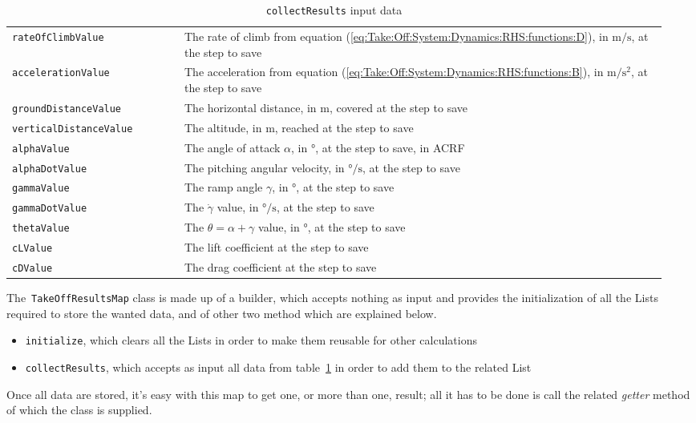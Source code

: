 \begin{table}[!t]
{\begin{tabular}{p{0.25\linewidth}p{0.7\linewidth}}
\lstinline[language=Java]!rateOfClimbValue! & The rate of climb from equation (\ref{eq:Take:Off:System:Dynamics:RHS:functions:D}), in  $\si{\meter\per\second}$, at the step to save \\  [0.2cm]
\lstinline[language=Java]!accelerationValue! & The acceleration from equation (\ref{eq:Take:Off:System:Dynamics:RHS:functions:B}), in  $\si{\meter\per\square\second}$, at the step to save \\  [0.2cm]
\lstinline[language=Java]!groundDistanceValue! & The horizontal distance, in  $\si{\meter}$, covered at the step to save \\ [0.2cm]
\lstinline[language=Java]!verticalDistanceValue! & The altitude, in  $\si{\meter}$, reached at the step to save \\ [0.2cm]
\lstinline[language=Java]!alphaValue! & The angle of attack $\alpha$, in  $\si{\degree}$, at the step to save, in \gls{ACRF} \\ [0.2cm]
\lstinline[language=Java]!alphaDotValue! & The pitching angular velocity, in  $\si{\degree\per\second}$, at the step to save \\ [0.2cm]
\lstinline[language=Java]!gammaValue! & The ramp angle $\gamma$, in  $\si{\degree}$, at the step to save  \\ [0.2cm]
\lstinline[language=Java]!gammaDotValue! & The $\dot\gamma$ value, in  $\si{\degree\per\second}$, at the step to save \\ [0.2cm]
\lstinline[language=Java]!thetaValue! & The $\theta=\alpha+\gamma$ value, in  $\si{\degree}$, at the step to save \\ [0.2cm]
\lstinline[language=Java]!cLValue! & The lift coefficient at the step to save \\ [0.2cm]
\lstinline[language=Java]!cDValue! & The drag coefficient at the step to save \\ 
\bottomrule
\end{tabular}
}
\caption{\lstinline[language=Java]!collectResults! input data}
\label{table:TakeOffMapInput}
\end{table}

\bigskip
\noindent
The~\lstinline[language=Java]!TakeOffResultsMap! class is made up of a builder, which accepts nothing as input and provides the initialization of all the \gls{List}s required to store the wanted data, and of other two method which are explained below.
%
\begin{itemize}
\item \lstinline[language=Java]!initialize!, which clears all the \gls{List}s in order to make them reusable for other calculations
\item \lstinline[language=Java]!collectResults!, which accepts as input all data from table~\ref{table:TakeOffMapInput} in order to add them to the related \gls{List}
\end{itemize}
%
Once all data are stored, it's easy with this map to get one, or more than one, result; all it has to be done is call the related \emph{getter} method of which the class is supplied. 

